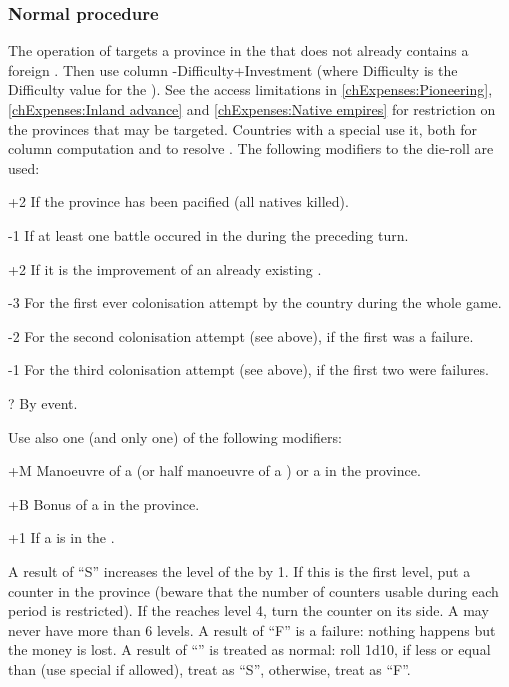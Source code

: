 \subsubsection{Normal procedure}
\aparag[Colonisation] The operation of  targets a province
in the \ROTW that does not already contains a foreign \COL. Then use column
\FTI-Difficulty+Investment (where Difficulty is the Difficulty value for the
\Area).
\bparag See the access limitations in \ref{chExpenses:Pioneering},
\ref{chExpenses:Inland advance} and \ref{chExpenses:Native empires} for
restriction on the provinces that may be targeted.
\bparag Countries with a special \FTI use it, both for column computation and
to resolve \undemi.
\bparag The following modifiers to the die-roll are used:
\begin{modlist}
\item[+2]If the province has been pacified (all natives killed).
\item[-1]If at least one battle occured in the \Area during the preceding
  turn.
\item[+2]If it is the improvement of an already existing \COL.
\item[-3]For the first ever colonisation attempt by the country during the
  whole game.
\item[-2]For the second colonisation attempt (see above), if the first was a
  failure.
\item[-1]For the third colonisation attempt (see above), if the first two were
  failures.
\item[\textplusminus?]By event.
\end{modlist}
\bparag Use also one (and only one) of the following modifiers:
\begin{modlist}
\item[+M]Manoeuvre of a \LeaderC (or half manoeuvre of a \LeaderE) or a
  \LeaderGov in the province.
\item[+B]Bonus of a \LeaderMis in the province.
\item[+1]If a \LeaderGov is in the \Area.
\end{modlist}

\bparag A result of ``S'' increases the level of the \COL by 1. If this is the
first level, put a counter in the province (beware that the number of counters
usable during each period is restricted). If the \COL reaches level 4, turn
the counter on its \Faceplus side. A \COL may never have more than 6 levels.
\bparag A result of ``F'' is a failure: nothing happens but the money is lost.
\bparag A result of ``\undemi'' is treated as normal: roll 1d10, if less or
equal than \FTI (use special \FTI if allowed), treat as ``S'', otherwise,
treat as ``F''.

